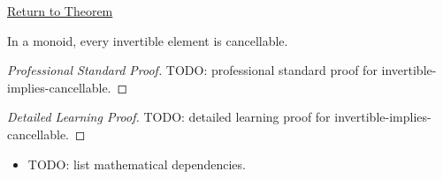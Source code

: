 \newpage
{}
\label{prf:invertible-implies-cancellable}

\begin{remark*}[Return]
\hyperref[prop:invertible-implies-cancellable]{Return to Theorem}
\end{remark*}

\begin{proposition*}
In a monoid, every invertible element is cancellable.
\end{proposition*}

\begin{proof}[Professional Standard Proof]
\LRAProofBodyStart
TODO: professional standard proof for invertible-implies-cancellable.
\end{proof}

\begin{proof}[Detailed Learning Proof]
\LRAProofBodyStart
TODO: detailed learning proof for invertible-implies-cancellable.
\end{proof}

\begin{remark*}
\end{remark*}

\begin{dependencies}
\begin{itemize}
  \item TODO: list mathematical dependencies.
\end{itemize}
\end{dependencies}

\clearpage
